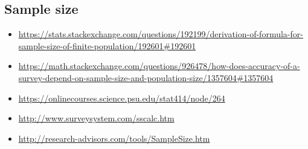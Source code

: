 \subsection{Sample size}
\begin{itemize}
\item \url{https://stats.stackexchange.com/questions/192199/derivation-of-formula-for-sample-size-of-finite-population/192601#192601}
\item \url{https://math.stackexchange.com/questions/926478/how-does-accuracy-of-a-survey-depend-on-sample-size-and-population-size/1357604#1357604}
\item \url{https://onlinecourses.science.psu.edu/stat414/node/264}
\item \url{http://www.surveysystem.com/sscalc.htm}
\item \url{http://research-advisors.com/tools/SampleSize.htm}
\end{itemize}



